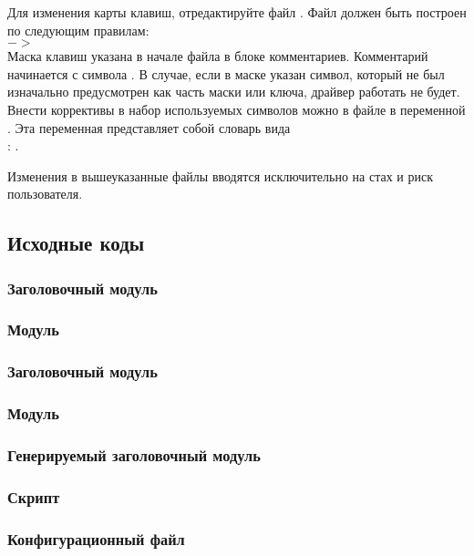 Для изменения карты клавиш, отредактируйте файл . Файл должен быть построен по следующим правилам:\\
 $->$ \\
Маска клавиш указана в начале файла в блоке комментариев.
Комментарий начинается с символа \key{\#}. В случае, если в маске указан символ, который не был изначально предусмотрен
как часть маски или ключа, драйвер работать не будет. Внести коррективы в набор используемых
символов можно в файле  в переменной . Эта переменная представляет собой
словарь вида\\  : .
\newpar

Изменения в вышеуказанные файлы вводятся исключительно на стах и риск пользователя.
\newpage
\subsection{Исходные коды}
\subsubsection*{Заголовочный модуль }

\newpage
\subsubsection*{Модуль }

\newpage
\subsubsection*{Заголовочный модуль }

\newpage
\subsubsection*{Модуль }

\newpage
\subsubsection*{Генерируемый заголовочный модуль }

\newpage
\subsubsection*{}

\newpage
\subsubsection*{Скрипт }

\newpage
\subsubsection*{Конфигурационный файл }

\newpage
